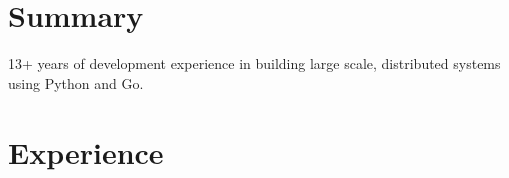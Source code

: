 \documentclass[margin,line]{resume}
\begin{document}
\address{github.com/nadeemsyed $\bullet$ (213) 985-6803 $\bullet$ snadeem.hameed@gmail.com $\bullet$ linkedin.com/in/nadeem-syed} 
\begin{resume}
\section{Summary}

{\small 13+ years of development experience in building large scale, distributed systems using Python and Go.
}

\section{Experience}


\end{resume}
\end{document}
